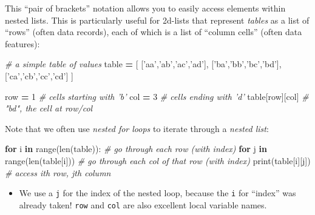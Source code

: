 \documentclass[]{book}
\newenvironment{Shaded}{\begin{snugshade}}{\end{snugshade}}
\newcommand{\KeywordTok}[1]{\textcolor[rgb]{0.13,0.29,0.53}{\textbf{#1}}}
\newcommand{\DecValTok}[1]{\textcolor[rgb]{0.00,0.00,0.81}{#1}}
\newcommand{\StringTok}[1]{\textcolor[rgb]{0.31,0.60,0.02}{#1}}
\newcommand{\CommentTok}[1]{\textcolor[rgb]{0.56,0.35,0.01}{\textit{#1}}}
\newcommand{\ControlFlowTok}[1]{\textcolor[rgb]{0.13,0.29,0.53}{\textbf{#1}}}
\newcommand{\OperatorTok}[1]{\textcolor[rgb]{0.81,0.36,0.00}{\textbf{#1}}}
\newcommand{\BuiltInTok}[1]{#1}
\newcommand{\NormalTok}[1]{#1}
\providecommand{\tightlist}{%
  \setlength{\itemsep}{0pt}\setlength{\parskip}{0pt}}
\begin{document}
This ``pair of brackets'' notation allows you to easily access elements
within nested lists. This is particularly useful for 2d-lists that
represent \emph{tables} as a list of ``rows'' (often data records), each
of which is a list of ``column cells'' (often data features):

\begin{Shaded}
\begin{Highlighting}[]
\CommentTok{# a simple table of values}
\NormalTok{table }\OperatorTok{=}\NormalTok{ [ [}\StringTok{'aa'}\NormalTok{,}\StringTok{'ab'}\NormalTok{,}\StringTok{'ac'}\NormalTok{,}\StringTok{'ad'}\NormalTok{],}
\NormalTok{          [}\StringTok{'ba'}\NormalTok{,}\StringTok{'bb'}\NormalTok{,}\StringTok{'bc'}\NormalTok{,}\StringTok{'bd'}\NormalTok{],}
\NormalTok{          [}\StringTok{'ca'}\NormalTok{,}\StringTok{'cb'}\NormalTok{,}\StringTok{'cc'}\NormalTok{,}\StringTok{'cd'}\NormalTok{] ]}

\NormalTok{row }\OperatorTok{=} \DecValTok{1}  \CommentTok{# cells starting with 'b'}
\NormalTok{col }\OperatorTok{=} \DecValTok{3}  \CommentTok{# cells ending with 'd'}
\NormalTok{table[row][col]  }\CommentTok{# "bd", the cell at row/col}
\end{Highlighting}
\end{Shaded}

Note that we often use \emph{nested for loops} to iterate through a
\emph{nested list}:

\begin{Shaded}
\begin{Highlighting}[]
\ControlFlowTok{for}\NormalTok{ i }\KeywordTok{in} \BuiltInTok{range}\NormalTok{(}\BuiltInTok{len}\NormalTok{(table)):  }\CommentTok{# go through each row (with index)}
    \ControlFlowTok{for}\NormalTok{ j }\KeywordTok{in} \BuiltInTok{range}\NormalTok{(}\BuiltInTok{len}\NormalTok{(table[i]))  }\CommentTok{# go through each col of that row (with index)}
        \BuiltInTok{print}\NormalTok{(table[i][j])  }\CommentTok{# access ith row, jth column}
\end{Highlighting}
\end{Shaded}

\begin{itemize}
\tightlist
\item
  We use a \texttt{j} for the index of the nested loop, because the
  \texttt{i} for ``index'' was already taken! \texttt{row} and
  \texttt{col} are also excellent local variable names.
\end{itemize}
\end{document}
